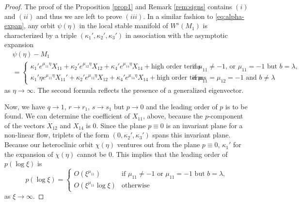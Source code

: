 \documentclass[usletter,11pt]{article}
\def\BO{{{O}}}
\theoremstyle{remark}
\begin{document}
\begin{proof}
The proof of the Proposition \ref{prop1} and Remark \ref{rem:signs} contains $(i)$ and $(ii)$ and thus we are left to prove $(iii)$. In a similar fashion to \eqref{eq:alpha-expan}, any orbit 
$\psi(\eta)$ in the local stable manifold of $W^s(M_1)$ is characterized by a triple $(\kappa_1',\kappa_2',\kappa_3')$ in association with the asymptotic expansion
\begin{equation}
\begin{aligned}
 &\psi(\eta) -M_1\\
 &= \begin{cases} \kappa_1'e^{\mu_{11}\eta}X_{11} + \kappa_2'e^{\mu_{12}\eta}X_{12} + \kappa_4'e^{\mu_{14}\eta}X_{14} + \text{high order terms} & \text{if $\mu_{11}\ne-1$, or $\mu_{11}=-1$ but $b=\lambda$,}\\
 \kappa_1'\eta e^{\mu_{11}\eta}X_{11}' + \kappa_2'e^{\mu_{12}\eta}X_{12} + \kappa_4'e^{\mu_{14}\eta}X_{14} + \text{high order terms} & \text{if $\mu_{11}= \mu_{12} = -1$ and $b \ne \lambda$}
 \end{cases}
\end{aligned}
\end{equation}
as $\eta \rightarrow \infty$. The second formula reflects the presence of a generalized eigenvector.

Now, we have $q \rightarrow 1$, $r \rightarrow r_1$, $s \rightarrow s_1$ but $p \rightarrow 0$ and the leading order of $p$ is to be found. We can determine the coefficient 
of $X_{11}$, above, because the $p$-component of the vectors $X_{12}$ and $X_{14}$ is $0$. 
Since the plane $p\equiv0$ is an invariant plane for a non-linear flow, triplets of the form $(0,\kappa_2',\kappa_3')$ spans this invariant plane. Because our heteroclinic orbit $\chi(\eta)$ ventures out from the plane $p\equiv0$, $\kappa_1'$ for the expansion of $\chi(\eta)$ cannot be $0$.
This implies that the leading order of $p(\log\xi)$ is
$$p(\log\xi) = \begin{cases} \BO(\xi^{\mu_{11}}) & \text{if $\mu_{11}\ne-1$ or $\mu_{11}=-1$ but $b=\lambda$,}\\
 \BO(\xi^{\mu_{11}}\log\xi) & \text{otherwise}
 \end{cases}
 $$
as $\xi \rightarrow \infty$.


\end{proof}
\end{document}

